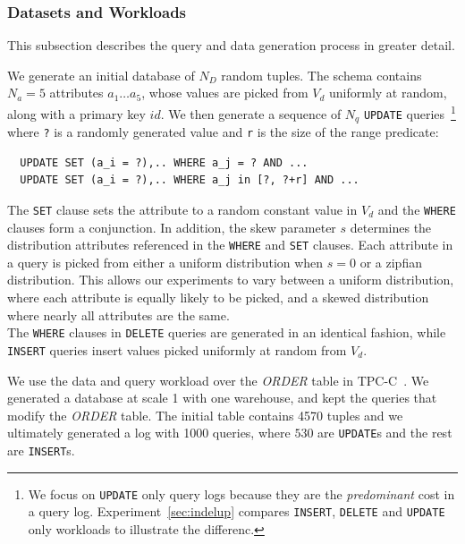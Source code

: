 \subsubsection{Datasets and Workloads}

This subsection describes the query and data generation process in greater detail.

 \label{sec:syntheticgen}
We generate an initial database of $N_D$ random tuples.  
The schema contains $N_a=5$ attributes $a_1\ldots a_5$, whose values are
picked from $V_d$ uniformly at random, along with a primary key $id$.
We then generate a sequence of $N_q$ \texttt{UPDATE} queries~\footnote{\scriptsize We focus on
\texttt{UPDATE} only query logs because they are the {\it predominant} cost 
in a query log.  Experiment~\ref{sec:indelup} compares \texttt{INSERT}, \texttt{DELETE} and \texttt{UPDATE}
only workloads to illustrate the differenc.} where 
\verb|?| is a randomly generated value and \verb|r| is the size of the range predicate: 
{\scriptsize
\begin{verbatim}
  UPDATE SET (a_i = ?),.. WHERE a_j = ? AND ...
  UPDATE SET (a_i = ?),.. WHERE a_j in [?, ?+r] AND ...
\end{verbatim}
}

The \texttt{SET} clause sets the attribute to a random constant value in $V_d$ and 
the \texttt{WHERE} clauses form a conjunction.  
In addition, the skew parameter $s$ determines the distribution attributes referenced in the \texttt{WHERE} and \texttt{SET} clauses.  
Each attribute in a query is picked from either a uniform distribution when $s=0$ or a zipfian~\cite{zipf} distribution.
This allows our experiments to vary between a uniform distribution, where each attribute is
equally likely to be picked, and a skewed distribution where nearly all attributes are the same. \\
The \texttt{WHERE} clauses in \texttt{DELETE} queries are generated in an identical fashion, while
\texttt{INSERT} queries insert values picked uniformly at random from $V_d$.



 We use the data and query workload over the {\it ORDER} table in TPC-C~\cite{tpcc}.  
We generated a database at scale 1 with one warehouse, and kept the queries that modify the
{\it ORDER} table. The initial table contains 4570 tuples and we ultimately generated a log with
1000 queries, where $530$ are \texttt{UPDATE}s and the rest are \texttt{INSERT}s.

